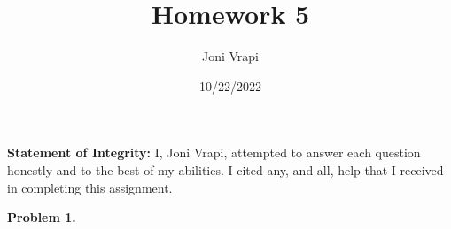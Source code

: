 \documentclass{article}
\title{Homework 5}
\author{Joni Vrapi}
\date{10/22/2022}
\begin{document}
\maketitle

\textbf{Statement of Integrity:} I, Joni Vrapi, attempted to answer each question honestly and to the best of my abilities. I cited any, and all, help that I received in completing this assignment.

\hfill

\textbf{Problem 1.} 

\newpage
 

\end{document}

